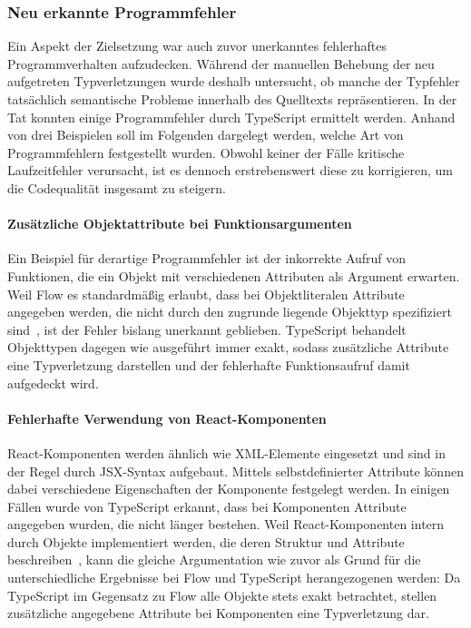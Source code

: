 \subsubsection{Neu erkannte Programmfehler}

Ein Aspekt der Zielsetzung war auch zuvor unerkanntes fehlerhaftes Programmverhalten aufzudecken. Während der manuellen Behebung der neu aufgetreten Typverletzungen wurde deshalb untersucht, ob manche der Typfehler tatsächlich semantische Probleme innerhalb des Quelltexts repräsentieren. In der Tat konnten einige Programmfehler durch TypeScript ermittelt werden. Anhand von drei Beispielen soll im Folgenden dargelegt werden, welche Art von Programmfehlern festgestellt wurden. Obwohl keiner der Fälle kritische Laufzeitfehler verursacht, ist es dennoch erstrebenswert diese zu korrigieren, um die Codequalität insgesamt zu steigern.

\vspace{-0.5\baselineskip}
\paragraph{Zusätzliche Objektattribute bei Funktionsargumenten}
Ein Beispiel für derartige Programmfehler ist der inkorrekte Aufruf von Funktionen, die ein Objekt mit verschiedenen Attributen als Argument erwarten. Weil Flow es standardmäßig erlaubt, dass bei Objektliteralen Attribute angegeben werden, die nicht durch den zugrunde liegende Objekttyp spezifiziert sind~\autocite{FLOW:WIDTH_SUBTYPING}, ist der Fehler bislang unerkannt geblieben. TypeScript behandelt Objekttypen dagegen wie ausgeführt immer exakt, sodass zusätzliche Attribute eine Typverletzung darstellen und der fehlerhafte Funktionsaufruf damit aufgedeckt wird.

\vspace{-0.5\baselineskip}
\paragraph{Fehlerhafte Verwendung von React-Komponenten}
React-Komponenten werden ähnlich wie XML-Elemente eingesetzt und sind in der Regel durch JSX-Syntax aufgebaut. Mittels selbstdefinierter Attribute können dabei verschiedene Eigenschaften der Komponente festgelegt werden. In einigen Fällen wurde von TypeScript erkannt, dass bei Komponenten Attribute angegeben wurden, die nicht länger bestehen. Weil React-Komponenten intern durch Objekte implementiert werden, die deren Struktur und Attribute beschreiben~\autocite{REACT:REACT_ELEMENTS}, kann die gleiche Argumentation wie zuvor als Grund für die unterschiedliche Ergebnisse bei Flow und TypeScript herangezogenen werden: Da TypeScript im Gegensatz zu Flow alle Objekte stets exakt betrachtet, stellen zusätzliche angegebene Attribute bei Komponenten eine Typverletzung dar.


